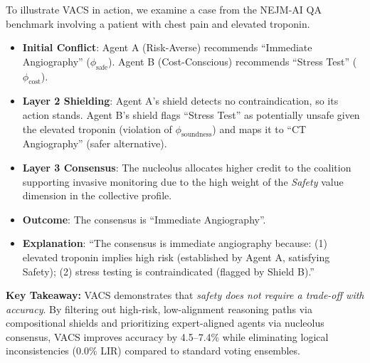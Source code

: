 \documentclass[12pt,a4paper]{article}
\begin{document}
To illustrate VACS in action, we examine a case from the NEJM-AI QA benchmark involving a patient with chest pain and elevated troponin.
\begin{itemize}[leftmargin=*]
    \item \textbf{Initial Conflict}: Agent A (Risk-Averse) recommends ``Immediate Angiography'' ($\phi_{\text{safe}}$). Agent B (Cost-Conscious) recommends ``Stress Test'' ($\phi_{\text{cost}}$).
    \item \textbf{Layer 2 Shielding}: Agent A's shield detects no contraindication, so its action stands. Agent B's shield flags ``Stress Test'' as potentially unsafe given the elevated troponin (violation of $\phi_{\text{soundness}}$) and maps it to ``CT Angiography'' (safer alternative).
    \item \textbf{Layer 3 Consensus}: The nucleolus allocates higher credit to the coalition supporting invasive monitoring due to the high weight of the \textit{Safety} value dimension in the collective profile.
    \item \textbf{Outcome}: The consensus is ``Immediate Angiography''.
    \item \textbf{Explanation}: ``The consensus is immediate angiography because: (1) elevated troponin implies high risk (established by Agent A, satisfying Safety); (2) stress testing is contraindicated (flagged by Shield B).''
\end{itemize}

\vspace{12pt}
\begin{mdframed}[backgroundcolor=gray!10, roundcorner=5pt]
\textbf{Key Takeaway:} VACS demonstrates that \emph{safety does not require a trade-off with accuracy}. By filtering out high-risk, low-alignment reasoning paths via compositional shields and prioritizing expert-aligned agents via nucleolus consensus, VACS improves accuracy by 4.5--7.4\% while eliminating logical inconsistencies ($0.0\%$ LIR) compared to standard voting ensembles.
\end{mdframed}


\end{document}
